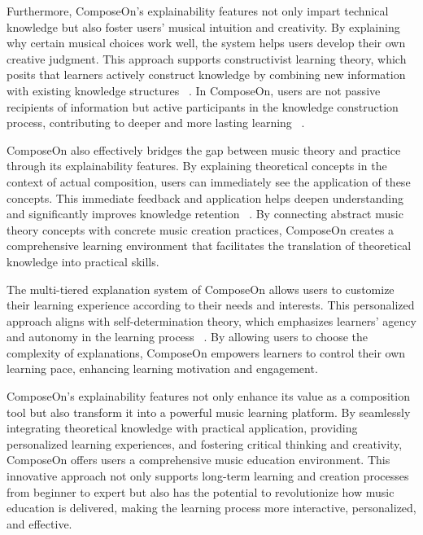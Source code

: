 Furthermore, ComposeOn's explainability features not only impart technical knowledge but also foster users' musical intuition and creativity. By explaining why certain musical choices work well, the system helps users develop their own creative judgment. This approach supports constructivist learning theory, which posits that learners actively construct knowledge by combining new information with existing knowledge structures ~\cite{ormrod2020human}. In ComposeOn, users are not passive recipients of information but active participants in the knowledge construction process, contributing to deeper and more lasting learning ~\cite{r21}.

ComposeOn also effectively bridges the gap between music theory and practice through its explainability features. By explaining theoretical concepts in the context of actual composition, users can immediately see the application of these concepts. This immediate feedback and application helps deepen understanding and significantly improves knowledge retention ~\cite{hattie2007power}. By connecting abstract music theory concepts with concrete music creation practices, ComposeOn creates a comprehensive learning environment that facilitates the translation of theoretical knowledge into practical skills.

The multi-tiered explanation system of ComposeOn allows users to customize their learning experience according to their needs and interests. This personalized approach aligns with self-determination theory, which emphasizes learners' agency and autonomy in the learning process ~\cite{ryan2020self}. By allowing users to choose the complexity of explanations, ComposeOn empowers learners to control their own learning pace, enhancing learning motivation and engagement.

ComposeOn's explainability features not only enhance its value as a composition tool but also transform it into a powerful music learning platform. By seamlessly integrating theoretical knowledge with practical application, providing personalized learning experiences, and fostering critical thinking and creativity, ComposeOn offers users a comprehensive music education environment. This innovative approach not only supports long-term learning and creation processes from beginner to expert but also has the potential to revolutionize how music education is delivered, making the learning process more interactive, personalized, and effective.